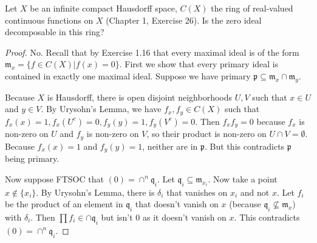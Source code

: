 \begin{exercise}
	Let $X\!$ be an infinite compact Hausdorff space, $C(X)$ the ring of real-valued continuous functions on $X\!$ (Chapter 1, Exercise 26). Is the zero ideal decomposable in this ring? 
\end{exercise}
\begin{proof}
	No.
	Recall that by Exercise 1.16 that every maximal ideal is of the form $\mathfrak{m}_x = \{f \in C(X) | f(x) = 0\}   $.
	First we show that every primary ideal is contained in exactly one maximal ideal.
	Suppose we have primary $\mathfrak{p} \subseteq \mathfrak{m}_x \cap \mathfrak{m}_y$.

	Because $X $ is Hausdorff, there is open disjoint neighborhoods $U,V $ such that $x \in U $ and $y \in V $.
	By Urysohn's Lemma, we have $f_x, f_y \in C(X)$ such that $f_x(x) = 1, f_x(U^c) = 0, f_y(y) = 1, f_y(V^c) = 0$.
	Then $f_xf_y = 0 $ because $f_x $ is non-zero on $U $ and $f_y $ is non-zero on $V $, so their product is non-zero on $U\cap V = \emptyset$.
	Because $f_x(x) = 1 $ and $f_y(y) = 1 $, neither are in $\mathfrak{p} $.
	But this contradicts $\mathfrak{p} $ being primary.

	Now suppose FTSOC that $(0) = \cap^n \mathfrak{q}_i $.
	Let $\mathfrak{q}_i \subseteq \mathfrak{m}_{x_i} $.
	Now take a point $x \notin \{x_i\}   $.
	By Urysohn's Lemma, there is $\delta_i$ that vanishes on $x_i $ and not $x $.
	Let $f_i $ be the product of an element in $\mathfrak{q}_i $ that doesn't vanish on $x $ (because $\mathfrak{q}_i \not \subseteq \mathfrak{m}_x $) with $\delta_i $.
	Then $\prod f_i \in \cap \mathfrak{q}_i $ but isn't $0 $ as it doesn't vanish on $x $.
	This contradicts $(0) = \cap^n \mathfrak{q}_i $.
\end{proof}


